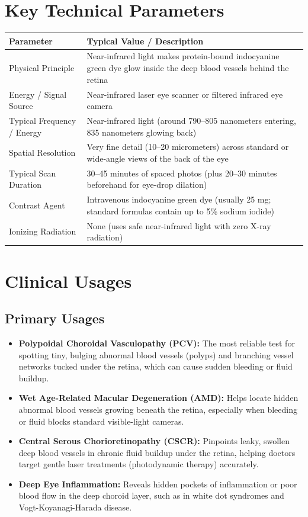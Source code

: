 \section{Key Technical Parameters}

\noindent\begin{tabularx}{\textwidth}{@{}l X@{}}
\toprule
\textbf{Parameter} & \textbf{Typical Value / Description} \\
\midrule
Physical Principle & Near-infrared light makes protein-bound indocyanine green dye glow inside the deep blood vessels behind the retina \\
Energy / Signal Source & Near-infrared laser eye scanner or filtered infrared eye camera \\
Typical Frequency / Energy & Near-infrared light (around 790--805 nanometers entering, 835 nanometers glowing back) \\
Spatial Resolution & Very fine detail (10--20 micrometers) across standard or wide-angle views of the back of the eye \\
Typical Scan Duration & 30--45 minutes of spaced photos (plus 20--30 minutes beforehand for eye-drop dilation) \\
Contrast Agent & Intravenous indocyanine green dye (usually 25 mg; standard formulas contain up to 5\% sodium iodide) \\
Ionizing Radiation & None (uses safe near-infrared light with zero X-ray radiation) \\
\bottomrule
\end{tabularx}

\section{Clinical Usages}

\subsection{Primary Usages}

\begin{itemize}
    \item \textbf{Polypoidal Choroidal Vasculopathy (PCV):} The most reliable test for spotting tiny, bulging abnormal blood vessels (polyps) and branching vessel networks tucked under the retina, which can cause sudden bleeding or fluid buildup.
    \item \textbf{Wet Age-Related Macular Degeneration (AMD):} Helps locate hidden abnormal blood vessels growing beneath the retina, especially when bleeding or fluid blocks standard visible-light cameras.
    \item \textbf{Central Serous Chorioretinopathy (CSCR):} Pinpoints leaky, swollen deep blood vessels in chronic fluid buildup under the retina, helping doctors target gentle laser treatments (photodynamic therapy) accurately.
    \item \textbf{Deep Eye Inflammation:} Reveals hidden pockets of inflammation or poor blood flow in the deep choroid layer, such as in white dot syndromes and Vogt-Koyanagi-Harada disease.
\end{itemize}

